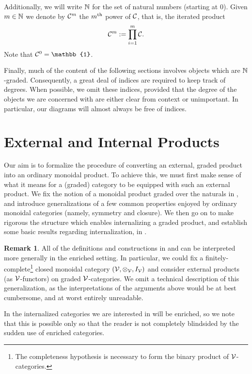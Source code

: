 \documentclass[openany, amssymb, psamsfonts]{amsart}
\theoremstyle{definition}
\newtheorem{rem}{Remark}[section]
\numberwithin{equation}{section}
\begin{document}
Additionally, we will write $\mathbb{N}$ for the set of natural numbers (starting at $0$). Given $m \in \mathbb{N}$ we denote by $\mathcal{C}^m$ the $m^\text{th}$ power of $\mathcal{C}$, that is, the iterated product
\begin{equation*}
    \mathcal{C}^m := \prod_{i = 1}^m \mathcal{C}.
\end{equation*} Note that $\C^0 = \mathbb{1}$.

Finally, much of the content of the following sections involves objects which are $\mathbb{N}$-graded. Consequently, a great deal of indices are required to keep track of degrees. When possible, we omit these indices, provided that the degree of the objects we are concerned with are either clear from context or unimportant. In particular, our diagrams will almost always be free of indices.

\section{External and Internal Products}
\label{section:external_and_internal}

Our aim is to formalize the procedure of converting an external, graded product into an ordinary monoidal product. To achieve this, we must first make sense of what it means for a (graded) category to be equipped with such an external product. We fix the notion of a monoidal product graded over the naturals in , and introduce generalizations of a few common properties enjoyed by ordinary monoidal categories (namely, symmetry and closure). We then go on to make rigorous the structure which enables internalizing a graded product, and establish some basic results regarding internalization, in .

\begin{rem}\label{rem:enriched} 
    All of the definitions and constructions in  and  can be interpreted more generally in the enriched setting. In particular, we could fix a finitely-complete\footnote{The completeness hypothesis is necessary to form the binary product of $\mathcal{V}$-categories.} closed monoidal category $(\mathcal{V}, \otimes_{\mathcal{V}}, I_{\mathcal{V}})$ and consider external products (as $\mathcal{V}$-functors) on graded $\mathcal{V}$-categories. We omit a technical description of this generalization, as the interpretations of the arguments above would be at best cumbersome, and at worst entirely unreadable. 
    
    In  the internalized categories we are interested in will be enriched, so we note that this is possible only so that the reader is not completely blindsided by the sudden use of enriched categories.
\end{rem}
\end{document}

